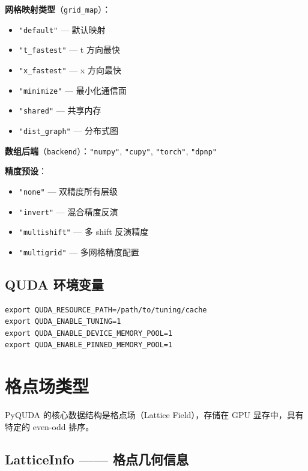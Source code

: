 \documentclass[12pt,a4paper]{ctexart}
\begin{document}
\textbf{网格映射类型}（\texttt{grid\_map}）：
\begin{itemize}[itemsep=2pt]
    \item \texttt{"default"} — 默认映射
    \item \texttt{"t\_fastest"} — t 方向最快
    \item \texttt{"x\_fastest"} — x 方向最快
    \item \texttt{"minimize"} — 最小化通信面
    \item \texttt{"shared"} — 共享内存
    \item \texttt{"dist\_graph"} — 分布式图
\end{itemize}

\textbf{数组后端}（\texttt{backend}）：\texttt{"numpy"}, \texttt{"cupy"}, \texttt{"torch"}, \texttt{"dpnp"}

\textbf{精度预设}：
\begin{itemize}[itemsep=2pt]
    \item \texttt{"none"} — 双精度所有层级
    \item \texttt{"invert"} — 混合精度反演
    \item \texttt{"multishift"} — 多 shift 反演精度
    \item \texttt{"multigrid"} — 多网格精度配置
\end{itemize}

\subsection{QUDA 环境变量}

\begin{lstlisting}[style=bashcode]
export QUDA_RESOURCE_PATH=/path/to/tuning/cache
export QUDA_ENABLE_TUNING=1
export QUDA_ENABLE_DEVICE_MEMORY_POOL=1
export QUDA_ENABLE_PINNED_MEMORY_POOL=1
\end{lstlisting}

\section{格点场类型}

PyQUDA 的核心数据结构是格点场（Lattice Field），存储在 GPU 显存中，具有特定的 even-odd 排序。

\subsection{LatticeInfo —— 格点几何信息}
\end{document}
